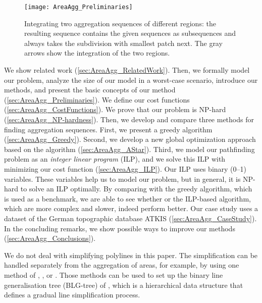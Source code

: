 \documentclass[acmsmall,natbib=false]{acmart}
\begin{document}
\begin{figure*}[tb]
\centering
\texttt{[image: AreaAgg\_Preliminaries]}
\caption{Integrating two aggregation sequences 
	of different regions: 
	the resulting sequence contains the given sequences 
	as subsequences and 
	always takes the subdivision with smallest patch next.
	The gray arrows show the integration of the two regions.
}
\label{fig:AreaAgg_IntegrateSequence}
\end{figure*}

We  show  related work (\sect\ref{sec:AreaAgg_RelatedWork}).
Then, we formally model our problem, 
analyze the size of our model in a worst-case scenario,
introduce our methods,
and present the basic concepts of our method
(\sect\ref{sec:AreaAgg_Preliminaries}).
We define our cost functions 
(\sect\ref{sec:AreaAgg_CostFunctions}).
We prove that our problem is NP-hard
(\sect\ref{sec:AreaAgg_NP-hardness}).
Then, we develop and compare three methods 
for finding aggregation sequences.
First, we present 
a greedy algorithm (\sect\ref{sec:AreaAgg_Greedy}).
Second, we develop a new global optimization approach
based on the \Astar algorithm 
(\sect\ref{sec:AreaAgg_AStar}).
Third, we model our pathfinding problem as
an \emph{integer linear program} (ILP), 
and we solve this ILP with minimizing our cost function
(\sect\ref{sec:AreaAgg_ILP}).
Our ILP uses binary (0--1) variables. 
These variables help us to model our problem, 
but in general, it is NP-hard 
to solve an ILP optimally.
By comparing with the greedy algorithm, 
which is used as a benchmark,
we are able to see whether \Astar or the ILP-based algorithm, 
which are more complex and slower, indeed perform better.  
Our case study 
uses a dataset of the German topographic database ATKIS 
(\sect\ref{sec:AreaAgg_CaseStudy}).
In the concluding remarks, we show possible ways to improve our 
methods (\sect\ref{sec:AreaAgg_Conclusions}). 

We do not deal with simplifying polylines in this paper.
The simplification can be handled separately from the
aggregation of areas, for example, 
by using one method of 
\textcite{Douglas1973},
\textcite{Saalfeld1999},
or \textcite{Wu2004DP}.
Those methods can be used to set up 
the binary line generalisation tree (BLG-tree) of
\textcite{vanOosterom1995Development},
which is a hierarchical data structure that 
defines a gradual line simplification process.
\end{document}
